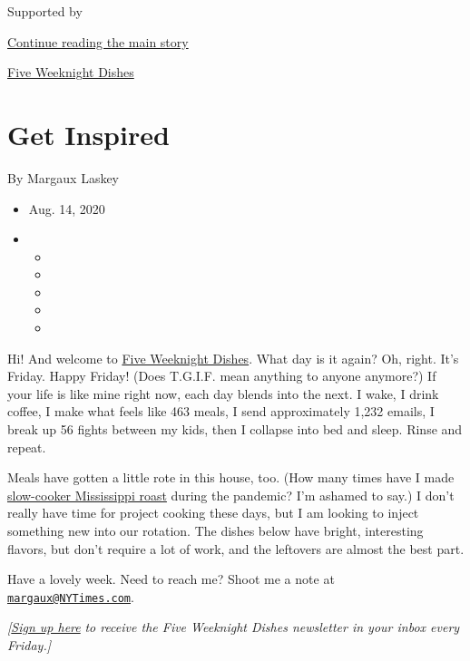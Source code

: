 Supported by

\protect\hyperlink{after-sponsor}{Continue reading the main story}

\href{/column/five-weeknight-dishes}{Five Weeknight Dishes}

\hypertarget{get-inspired}{%
\section{Get Inspired}\label{get-inspired}}

By Margaux Laskey

\begin{itemize}
\item
  Aug. 14, 2020
\item
  \begin{itemize}
  \item
  \item
  \item
  \item
  \item
  \end{itemize}
\end{itemize}

Hi! And welcome to
\href{https://www.nytimes3xbfgragh.onion/column/five-weeknight-dishes}{Five
Weeknight Dishes}. What day is it again? Oh, right. It's Friday. Happy
Friday! (Does T.G.I.F. mean anything to anyone anymore?) If your life is
like mine right now, each day blends into the next. I wake, I drink
coffee, I make what feels like 463 meals, I send approximately 1,232
emails, I break up 56 fights between my kids, then I collapse into bed
and sleep. Rinse and repeat.

Meals have gotten a little rote in this house, too. (How many times have
I made
\href{https://cooking.nytimes3xbfgragh.onion/recipes/1017937-mississippi-roast}{slow-cooker
Mississippi roast} during the pandemic? I'm ashamed to say.) I don't
really have time for project cooking these days, but I am looking to
inject something new into our rotation. The dishes below have bright,
interesting flavors, but don't require a lot of work, and the leftovers
are almost the best part.

Have a lovely week. Need to reach me? Shoot me a note at
\href{mailto:margaux@NYTimes.com}{\nolinkurl{margaux@NYTimes.com}}.

\emph{{[}}\href{https://www.nytimes3xbfgragh.onion/newsletters/five-weeknight-dishes?module=inline}{\emph{Sign
up here}} \emph{to receive the Five Weeknight Dishes newsletter in your
inbox every Friday.{]}}

